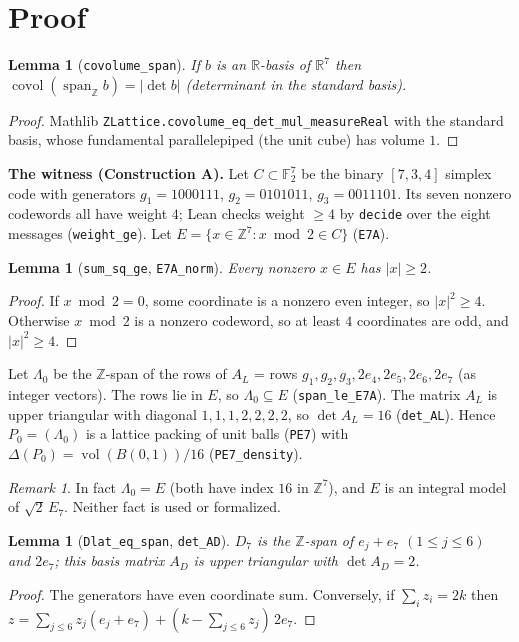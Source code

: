 \documentclass[11pt]{article}
\newtheorem{lemma}[theorem]{Lemma}
\theoremstyle{definition}
\theoremstyle{remark}
\newtheorem{remark}[theorem]{Remark}
\newcommand{\R}{\mathbb{R}}
\newcommand{\Z}{\mathbb{Z}}
\newcommand{\covol}{\operatorname{covol}}
\newcommand{\vol}{\operatorname{vol}}
\begin{document}
\section{Proof}

\begin{lemma}[\texttt{covolume\_span}]
If $b$ is an $\R$-basis of $\R^7$ then $\covol(\operatorname{span}_\Z b)=|\det b|$ (determinant
in the standard basis).
\end{lemma}
\begin{proof}
Mathlib \texttt{ZLattice.covolume\_eq\_det\_mul\_measureReal} with the standard basis, whose
fundamental parallelepiped (the unit cube) has volume $1$.
\end{proof}

\textbf{The witness (Construction A).} Let $C\subset\mathbb{F}_2^7$ be the binary $[7,3,4]$
simplex code with generators $g_1=1000111$, $g_2=0101011$, $g_3=0011101$. Its seven nonzero
codewords all have weight $4$; Lean checks weight $\ge 4$ by \texttt{decide} over the eight messages
(\texttt{weight\_ge}). Let $E=\{x\in\Z^7: x \bmod 2\in C\}$ (\texttt{E7A}).

\begin{lemma}[\texttt{sum\_sq\_ge}, \texttt{E7A\_norm}]
Every nonzero $x\in E$ has $|x|\ge 2$.
\end{lemma}
\begin{proof}
If $x\bmod 2=0$, some coordinate is a nonzero even integer, so $|x|^2\ge4$. Otherwise $x\bmod 2$ is
a nonzero codeword, so at least $4$ coordinates are odd, and $|x|^2\ge4$.
\end{proof}

Let $\Lambda_0$ be the $\Z$-span of the rows of
$A_L$ = rows $g_1,g_2,g_3,2e_4,2e_5,2e_6,2e_7$ (as integer vectors). The rows lie in $E$, so
$\Lambda_0\subseteq E$ (\texttt{span\_le\_E7A}). The matrix $A_L$ is upper triangular with
diagonal $1,1,1,2,2,2,2$, so $\det A_L=16$ (\texttt{det\_AL}). Hence $P_0=(\Lambda_0)$ is a lattice
packing of unit balls (\texttt{PE7}) with $\Delta(P_0)=\vol(B(0,1))/16$ (\texttt{PE7\_density}).

\begin{remark}
In fact $\Lambda_0=E$ (both have index $16$ in $\Z^7$), and $E$ is an integral model of
$\sqrt2\,E_7$. Neither fact is used or formalized.
\end{remark}

\begin{lemma}[\texttt{Dlat\_eq\_span}, \texttt{det\_AD}]
$D_7$ is the $\Z$-span of $e_j+e_7$ $(1\le j\le 6)$ and $2e_7$; this basis matrix $A_D$ is upper
triangular with $\det A_D=2$.
\end{lemma}
\begin{proof}
The generators have even coordinate sum. Conversely, if $\sum_i z_i=2k$ then
$z=\sum_{j\le6}z_j(e_j+e_7)+(k-\sum_{j\le6}z_j)\,2e_7$.
\end{proof}
\end{document}
